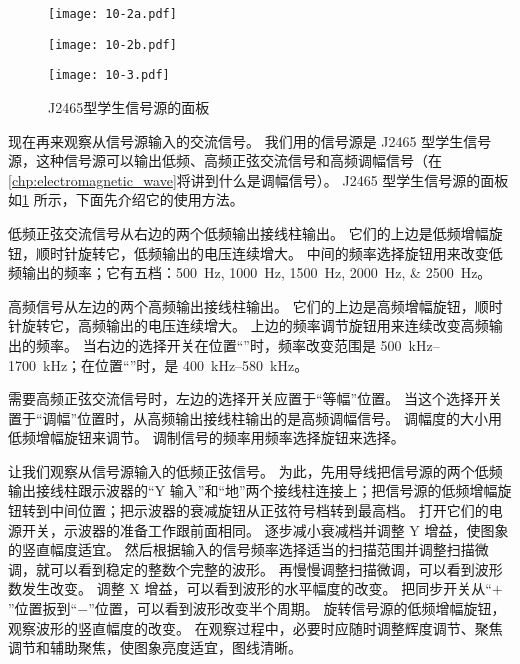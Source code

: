 \begin{figure}
  \begin{minipage}[b]{0.6\linewidth}
    \begin{minipage}[b]{0.5\linewidth}\centering
      \texttt{[image: 10-2a.pdf]}
      \subcaption{}\label{fig:10-2a}
    \end{minipage}%
    \begin{minipage}[b]{0.5\linewidth}\centering
      \texttt{[image: 10-2b.pdf]}
      \subcaption{}\label{fig:10-2b}
    \end{minipage}
    \caption{}\label{fig:10-2}
  \end{minipage}%
  \begin{minipage}[b]{0.4\linewidth}\centering
    \texttt{[image: 10-3.pdf]}
    \caption{J2465型学生信号源的面板}\label{fig:10-3}
  \end{minipage}
\end{figure}

现在再来观察从信号源输入的交流信号。
我们用的信号源是 J2465 型学生信号源，这种信号源可以输出低频、高频正弦交流信号和高频调幅信号（在\cref{chp:electromagnetic_wave}将讲到什么是调幅信号）。
J2465 型学生信号源的面板如\cref{fig:10-3} 所示，下面先介绍它的使用方法。

低频正弦交流信号从右边的两个低频输出接线柱输出。
它们的上边是低频增幅旋钮，顺时针旋转它，低频输出的电压连续增大。
中间的频率选择旋钮用来改变低频输出的频率；它有五档：\qtylist{500;1000;1500;2000;2500}{Hz}。

高频信号从左边的两个高频输出接线柱输出。
它们的上边是高频增幅旋钮，顺时针旋转它，高频输出的电压连续增大。
上边的频率调节旋钮用来连续改变高频输出的频率。
当右边的选择开关在位置“”时，频率改变范围是 \qtyrange{500}{1700}{kHz}；在位置“”时，是 \qtyrange{400}{580}{kHz}。

需要高频正弦交流信号时，左边的选择开关应置于“等幅”位置。
当这个选择开关置于“调幅”位置时，从高频输出接线柱输出的是高频调幅信号。
调幅度的大小用低频增幅旋钮来调节。
调制信号的频率用频率选择旋钮来选择。

让我们观察从信号源输入的低频正弦信号。
为此，先用导线把信号源的两个低频输出接线柱跟示波器的“Y 输入”和“地”两个接线柱连接上；把信号源的低频增幅旋钮转到中间位置；把示波器的衰减旋钮从正弦符号档转到最高档。
打开它们的电源开关，示波器的准备工作跟前面相同。
逐步减小衰减档并调整 Y 增益，使图象的竖直幅度适宜。
然后根据输入的信号频率选择适当的扫描范围并调整扫描微调，就可以看到稳定的整数个完整的波形。
再慢慢调整扫描微调，可以看到波形数发生改变。
调整 X 增益，可以看到波形的水平幅度的改变。
把同步开关从“$+$”位置扳到“$-$”位置，可以看到波形改变半个周期。
旋转信号源的低频增幅旋钮，观察波形的竖直幅度的改变。
在观察过程中，必要时应随时调整辉度调节、聚焦调节和辅助聚焦，使图象亮度适宜，图线清晰。


